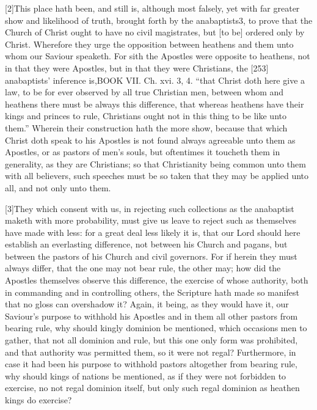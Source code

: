 [2]This place hath been, and still is, although most falsely, yet with far greater show and likelihood of truth, brought forth by the anabaptists3, to prove that the Church of Christ ought to have no civil magistrates, but [to be] ordered only by Christ. Wherefore they urge the opposition between heathens and them unto whom our Saviour speaketh. For sith the Apostles were opposite to heathens, not in that they were Apostles, but in that they were Christians, the [253] anabaptists’ inference is,BOOK VII. Ch. xvi. 3, 4. “that Christ doth here give a law, to be for ever observed by all true Christian men, between whom and heathens there must be always this difference, that whereas heathens have their kings and princes to rule, Christians ought not in this thing to be like unto them.” Wherein their construction hath the more show, because that which Christ doth speak to his Apostles is not found always agreeable unto them as Apostles, or as pastors of men’s souls, but oftentimes it toucheth them in generality, as they are Christians; so that Christianity being common unto them with all believers, such speeches must be so taken that they may be applied unto all, and not only unto them.

[3]They which consent with us, in rejecting such collections as the anabaptist maketh with more probability, must give us leave to reject such as themselves have made with less: for a great deal less likely it is, that our Lord should here establish an everlasting difference, not between his Church and pagans, but between the pastors of his Church and civil governors. For if herein they must always differ, that the one may not bear rule, the other may; how did the Apostles themselves observe this difference, the exercise of whose authority, both in commanding and in controlling others, the Scripture hath made so manifest that no gloss can overshadow it? Again, it being, as they would have it, our Saviour’s purpose to withhold his Apostles and in them all other pastors from bearing rule, why should kingly dominion be mentioned, which occasions men to gather, that not all dominion and rule, but this one only form was prohibited, and that authority was permitted them, so it were not regal? Furthermore, in case it had been his purpose to withhold pastors altogether from bearing rule, why should kings of nations be mentioned, as if they were not forbidden to exercise, no not regal dominion itself, but only such regal dominion as heathen kings do exercise?


